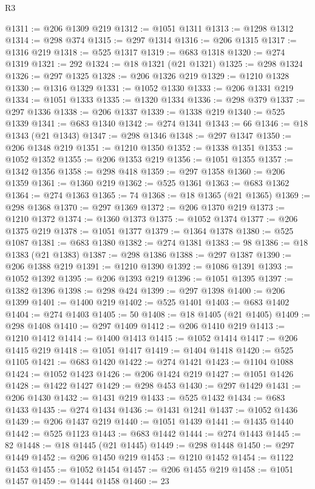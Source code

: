 \begin{lexlean}{R3}
\begin{coremodule}
@1311 := @206 @1309 @219
@1312 := @1051 @1311
@1313 := @1298 @1312
@1314 := @298 @374
@1315 := @297 @1314
@1316 := @206 @1315
@1317 := @1316 @219
@1318 := @525 @1317
@1319 := @683 @1318
@1320 := @274 @1319
@1321 := 292
@1324 := @18 @1321 (@21 @1321)
@1325 := @298 @1324
@1326 := @297 @1325
@1328 := @206 @1326 @219
@1329 := @1210 @1328
@1330 := @1316 @1329
@1331 := @1052 @1330
@1333 := @206 @1331 @219
@1334 := @1051 @1333
@1335 := @1320 @1334
@1336 := @298 @379
@1337 := @297 @1336
@1338 := @206 @1337
@1339 := @1338 @219
@1340 := @525 @1339
@1341 := @683 @1340
@1342 := @274 @1341
@1343 := 66
@1346 := @18 @1343 (@21 @1343)
@1347 := @298 @1346
@1348 := @297 @1347
@1350 := @206 @1348 @219
@1351 := @1210 @1350
@1352 := @1338 @1351
@1353 := @1052 @1352
@1355 := @206 @1353 @219
@1356 := @1051 @1355
@1357 := @1342 @1356
@1358 := @298 @418
@1359 := @297 @1358
@1360 := @206 @1359
@1361 := @1360 @219
@1362 := @525 @1361
@1363 := @683 @1362
@1364 := @274 @1363
@1365 := 74
@1368 := @18 @1365 (@21 @1365)
@1369 := @298 @1368
@1370 := @297 @1369
@1372 := @206 @1370 @219
@1373 := @1210 @1372
@1374 := @1360 @1373
@1375 := @1052 @1374
@1377 := @206 @1375 @219
@1378 := @1051 @1377
@1379 := @1364 @1378
@1380 := @525 @1087
@1381 := @683 @1380
@1382 := @274 @1381
@1383 := 98
@1386 := @18 @1383 (@21 @1383)
@1387 := @298 @1386
@1388 := @297 @1387
@1390 := @206 @1388 @219
@1391 := @1210 @1390
@1392 := @1086 @1391
@1393 := @1052 @1392
@1395 := @206 @1393 @219
@1396 := @1051 @1395
@1397 := @1382 @1396
@1398 := @298 @424
@1399 := @297 @1398
@1400 := @206 @1399
@1401 := @1400 @219
@1402 := @525 @1401
@1403 := @683 @1402
@1404 := @274 @1403
@1405 := 50
@1408 := @18 @1405 (@21 @1405)
@1409 := @298 @1408
@1410 := @297 @1409
@1412 := @206 @1410 @219
@1413 := @1210 @1412
@1414 := @1400 @1413
@1415 := @1052 @1414
@1417 := @206 @1415 @219
@1418 := @1051 @1417
@1419 := @1404 @1418
@1420 := @525 @1105
@1421 := @683 @1420
@1422 := @274 @1421
@1423 := @1104 @1088
@1424 := @1052 @1423
@1426 := @206 @1424 @219
@1427 := @1051 @1426
@1428 := @1422 @1427
@1429 := @298 @453
@1430 := @297 @1429
@1431 := @206 @1430
@1432 := @1431 @219
@1433 := @525 @1432
@1434 := @683 @1433
@1435 := @274 @1434
@1436 := @1431 @1241
@1437 := @1052 @1436
@1439 := @206 @1437 @219
@1440 := @1051 @1439
@1441 := @1435 @1440
@1442 := @525 @1123
@1443 := @683 @1442
@1444 := @274 @1443
@1445 := 82
@1448 := @18 @1445 (@21 @1445)
@1449 := @298 @1448
@1450 := @297 @1449
@1452 := @206 @1450 @219
@1453 := @1210 @1452
@1454 := @1122 @1453
@1455 := @1052 @1454
@1457 := @206 @1455 @219
@1458 := @1051 @1457
@1459 := @1444 @1458
@1460 := 23

\end{coremodule}
\end{lexlean}
